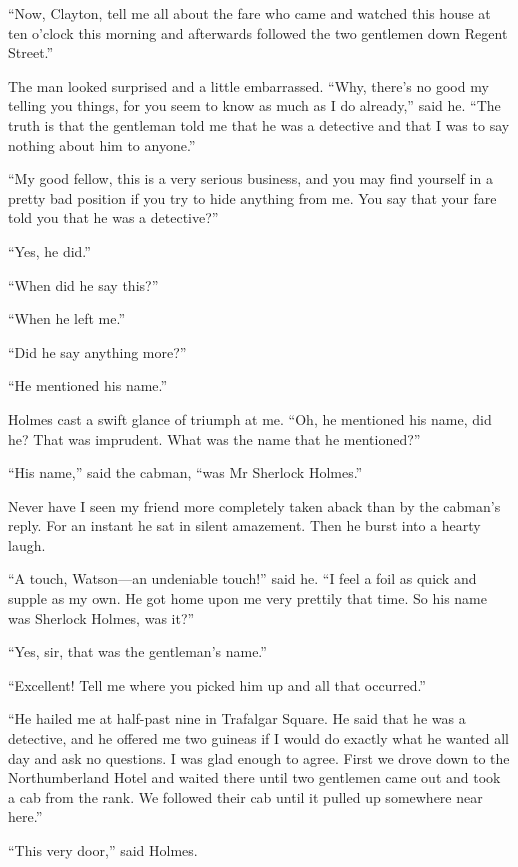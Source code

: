 \documentclass[paper=a5,BCOR=7mm,twoside,DIV=calc,12pt,usegeometry,openany,chapterprefix,endperiod,headings=big]{scrbook} %
\begin{document}
\enquote{Now, Clayton, tell me all about the fare who came and watched this house at ten o'clock this morning and afterwards followed the two gentlemen down Regent Street.}

The man looked surprised and a little embarrassed. \enquote{Why, there's no good my telling you things, for you seem to know as much as I do already,} said he. \enquote{The truth is that the gentleman told me that he was a detective and that I was to say nothing about him to anyone.}

\enquote{My good fellow, this is a very serious business, and you may find yourself in a pretty bad position if you try to hide anything from me. You say that your fare told you that he was a detective?}

\enquote{Yes, he did.}

\enquote{When did he say this?}

\enquote{When he left me.}

\enquote{Did he say anything more?}

\enquote{He mentioned his name.}


Holmes cast a swift glance of triumph at me. \enquote{Oh, he mentioned his name, did he? That was imprudent. What was the name that he mentioned?}

\enquote{His name,} said the cabman, \enquote{was Mr Sherlock Holmes.}

Never have I seen my friend more completely taken aback than by the cabman's reply. For an instant he sat in silent amazement. Then he burst into a hearty laugh.

\enquote{A touch, Watson---an undeniable touch!} said he. \enquote{I feel a foil as quick and supple as my own. He got home upon me very prettily that time. So his name was Sherlock Holmes, was it?}

\enquote{Yes, sir, that was the gentleman's name.}

\enquote{Excellent! Tell me where you picked him up and all that occurred.}

\enquote{He hailed me at half-past nine in Trafalgar Square. He said that he was a detective, and he offered me two guineas if I would do exactly what he wanted all day and ask no questions. I was glad enough to agree. First we drove down to the Northumberland Hotel and waited there until two gentlemen came out and took a cab from the rank. We followed their cab until it pulled up somewhere near here.}

\enquote{This very door,} said Holmes.
\end{document}
